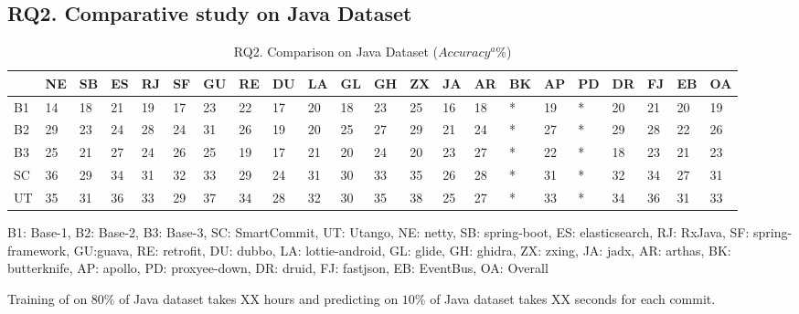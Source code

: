 \subsection{RQ2. Comparative study on Java Dataset}

\begin{table}[t]
	\caption{RQ2. Comparison on Java Dataset ($Accuracy^a$\%)}
	\vspace{-0.1in}
	\begin{center}
		\footnotesize
		\tabcolsep 4pt
		\renewcommand{\arraystretch}{1} \begin{tabular}{p{0.2cm}<{\centering}|p{0.10cm}<{\centering}p{0.10cm}<{\centering}p{0.10cm}<{\centering}p{0.10cm}<{\centering}p{0.10cm}<{\centering}p{0.10cm}<{\centering}p{0.10cm}<{\centering}p{0.10cm}<{\centering}p{0.10cm}<{\centering}p{0.10cm}<{\centering}p{0.10cm}<{\centering}p{0.10cm}<{\centering}p{0.10cm}<{\centering}p{0.10cm}<{\centering}p{0.10cm}<{\centering}p{0.10cm}<{\centering}p{0.10cm}<{\centering}p{0.10cm}<{\centering}p{0.10cm}<{\centering}p{0.10cm}<{\centering}|p{0.10cm}<{\centering}}
			
			\hline
				 & NE & SB & ES & RJ & SF & GU & RE & DU & LA & GL & GH & ZX & JA & AR & BK & AP & PD & DR & FJ & EB & OA \\
			\hline
			B1   &  14 &  18  &  21  &  19  & 17   &  23  & 22   &  17  &  20  &  18  &  23  &  25  &  16  &  18  & *  &  19  & *  & 20   & 21   &  20  & 19  \\
			B2   & 29   &  23  &  24  &  28  & 24   & 31   & 26   &  19  &  20  &  25  &  27  &  29  &  21  & 24   & *  &  27  & *  & 29   & 28   &  22  & 26  \\
			B3   &  25  &  21  &  27  & 24   & 26   & 25   & 19   & 17   &  21  &  20  & 24   & 20   & 23   & 27   & *  & 22   & *  &  18  & 23   &  21  & 23  \\
			SC   & 36   & 29   & 34   & 31   & 32   & 33   & 29   & 24   & 31   & 30   & 33   & 35   & 26   & 28   & *  &  31  & *  & 32   & 34   &  27  & 31  \\
			\hline
			UT   &  35  & 31   & 36   & 33   & 29   & 37   & 34   & 28   & 32   & 30   &  35  & 38   & 25   &  27  & *  &  33  & *  &  34  &  36  &  31  & 33  \\
			\hline
		\end{tabular}
		\label{RQ2-result}
		B1: Base-1, B2: Base-2, B3: Base-3, SC: SmartCommit, UT: Utango, NE: netty, SB: spring-boot, ES: elasticsearch, RJ: RxJava, SF: spring-framework, GU:guava, RE: retrofit, DU: dubbo, LA: lottie-android, GL: glide, GH: ghidra, ZX: zxing, JA: jadx, AR: arthas, BK: butterknife, AP: apollo, PD: proxyee-down, DR: druid, FJ: fastjson, EB: EventBus, OA: Overall
	\end{center}
\end{table}



Training of \tool on $80\%$ of Java dataset takes XX hours and predicting on $10\%$ of Java dataset takes XX seconds for each commit.